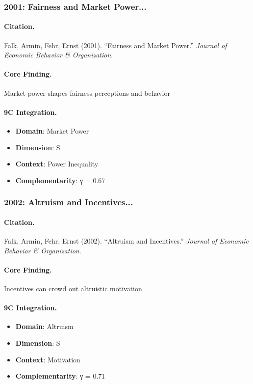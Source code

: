 \subsubsection{2001: Fairness and Market Power...}

\paragraph{Citation.}
Falk, Armin, Fehr, Ernst (2001). ``Fairness and Market Power.''
\textit{Journal of Economic Behavior & Organization}.

\paragraph{Core Finding.}
Market power shapes fairness perceptions and behavior

\paragraph{9C Integration.}
\begin{itemize}[nosep]
  \item \textbf{Domain}: Market Power
  \item \textbf{Dimension}: S
  \item \textbf{Context}: Power Inequality
  \item \textbf{Complementarity}: γ = 0.67
\end{itemize}


\subsubsection{2002: Altruism and Incentives...}

\paragraph{Citation.}
Falk, Armin, Fehr, Ernst (2002). ``Altruism and Incentives.''
\textit{Journal of Economic Behavior & Organization}.

\paragraph{Core Finding.}
Incentives can crowd out altruistic motivation

\paragraph{9C Integration.}
\begin{itemize}[nosep]
  \item \textbf{Domain}: Altruism
  \item \textbf{Dimension}: S
  \item \textbf{Context}: Motivation
  \item \textbf{Complementarity}: γ = 0.71
\end{itemize}


